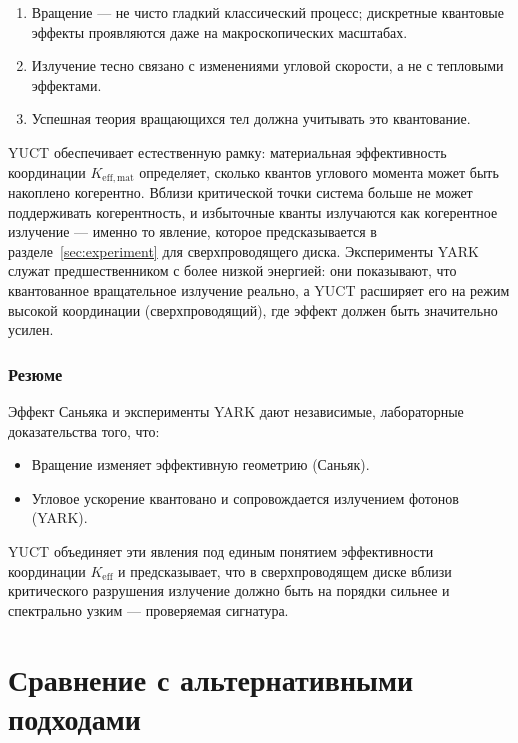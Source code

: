 \documentclass[12pt,a4paper]{article}
\begin{document}
	\begin{enumerate}
		\item Вращение — не чисто гладкий классический процесс; дискретные квантовые эффекты проявляются даже на макроскопических масштабах.
		\item Излучение тесно связано с изменениями угловой скорости, а не с тепловыми эффектами.
		\item Успешная теория вращающихся тел должна учитывать это квантование.
	\end{enumerate}
	
	YUCT обеспечивает естественную рамку: материальная эффективность координации \(K_{\mathrm{eff,mat}}\) определяет, сколько квантов углового момента может быть накоплено когерентно. Вблизи критической точки система больше не может поддерживать когерентность, и избыточные кванты излучаются как когерентное излучение — именно то явление, которое предсказывается в разделе~\ref{sec:experiment} для сверхпроводящего диска. Эксперименты YARK служат предшественником с более низкой энергией: они показывают, что квантованное вращательное излучение реально, а YUCT расширяет его на режим высокой координации (сверхпроводящий), где эффект должен быть значительно усилен.
	
	\subsubsection{Резюме}
	
	Эффект Саньяка и эксперименты YARK дают независимые, лабораторные доказательства того, что:
	\begin{itemize}
		\item Вращение изменяет эффективную геометрию (Саньяк).
		\item Угловое ускорение квантовано и сопровождается излучением фотонов (YARK).
	\end{itemize}
	YUCT объединяет эти явления под единым понятием эффективности координации \(K_{\mathrm{eff}}\) и предсказывает, что в сверхпроводящем диске вблизи критического разрушения излучение должно быть на порядки сильнее и спектрально узким — проверяемая сигнатура.
	
	\section{Сравнение с альтернативными подходами}
	\label{sec:comparison}
	
\end{document}
